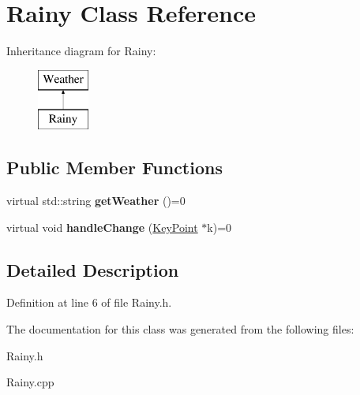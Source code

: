 \hypertarget{classRainy}{}\section{Rainy Class Reference}
\label{classRainy}
Inheritance diagram for Rainy\+:\begin{figure}[H]
\begin{center}
\leavevmode
\includegraphics[height=2.000000cm]{classRainy}
\end{center}
\end{figure}
\subsection*{Public Member Functions}
\begin{DoxyCompactItemize}
\item 
\mbox{\label{classRainy_a42457ad92074c333dbf91ca6a4c919ad}} 
virtual std\+::string {\bfseries get\+Weather} ()=0
\item 
\mbox{\label{classRainy_a68ec81d96d7d340ee9888ec458c09c29}} 
virtual void {\bfseries handle\+Change} (\hyperlink{classKeyPoint}{Key\+Point} $\ast$k)=0
\end{DoxyCompactItemize}


\subsection{Detailed Description}


Definition at line 6 of file Rainy.\+h.



The documentation for this class was generated from the following files\+:\begin{DoxyCompactItemize}
\item 
Rainy.\+h\item 
Rainy.\+cpp\end{DoxyCompactItemize}
